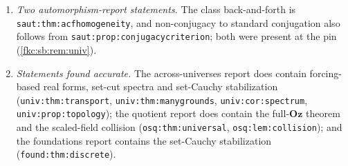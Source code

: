 \documentclass[11pt,letterpaper]{article}
\numberwithin{equation}{section}
\theoremstyle{definition}
\theoremstyle{remark}
\newcommand{\Oz}{\mathbf{Oz}}
\newcommand{\lbl}[1]{\nolinkurl{#1}}%
\begin{document}
\begin{enumerate}[label=\textup{(\arabic*)}]
\item \emph{Two automorphism-report statements.} The class back-and-forth is \lbl{saut:thm:acfhomogeneity}, and non-conjugacy to standard conjugation also follows from \lbl{saut:prop:conjugacycriterion}; both were present at the pin (\cref{fkc:sb:rem:univ}).
\item \emph{Statements found accurate.} The across-universes report does contain forcing-based real forms, set-cut spectra and set-Cauchy stabilization (\lbl{univ:thm:transport}, \lbl{univ:thm:manygrounds}, \lbl{univ:cor:spectrum}, \lbl{univ:prop:topology}); the quotient report does contain the full-$\Oz$ theorem and the scaled-field collision (\lbl{osq:thm:universal}, \lbl{osq:lem:collision}); and the foundations report contains the set-Cauchy stabilization (\lbl{found:thm:discrete}).
\end{enumerate}
\end{document}
